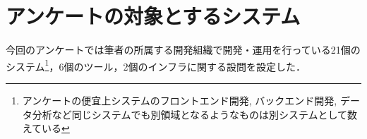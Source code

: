 \section{アンケートの対象とするシステム}
今回のアンケートでは筆者の所属する開発組織で開発・運用を行っている21個のシステム\footnote{アンケートの便宜上システムのフロントエンド開発, バックエンド開発, データ分析など同じシステムでも別領域となるようなものは別システムとして数えている}，6個のツール，2個のインフラに関する設問を設定した．
